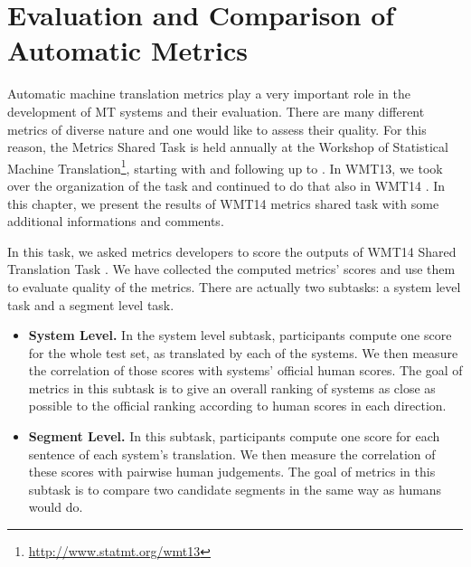 \chapter{Evaluation and Comparison of Automatic Metrics}
\label{metrics}

%
%

Automatic machine translation metrics play a very important role in the
development of MT systems and their evaluation. There are many different
metrics of diverse nature and one would like to assess their quality. For this
reason, the Metrics Shared Task is held annually at the Workshop of Statistical
Machine Translation\footnote{\url{http://www.statmt.org/wmt13}}, starting with
 and following up to
. In WMT13, we took over the organization of the
task  and continued to do that also in WMT14
. In this chapter, we present the results of WMT14
metrics shared task with some additional informations and comments.

In this task, we asked metrics developers to score the outputs of WMT14 Shared
Translation Task . We have collected the computed
metrics' scores and use them to evaluate quality of the metrics.  There are
actually two subtasks: a system level task and a segment level task.

\begin{itemize}

    \item \textbf{System Level.} In the system level subtask, participants
        compute one score for the whole test set, as translated by each of the
        systems. We then measure the correlation of those scores with systems'
        official human scores.  The goal of metrics in this subtask is to give
        an overall ranking of systems as close as possible to the official
        ranking according to human scores in each direction.
    
    \item \textbf{Segment Level.} In this subtask, participants compute one
        score for each sentence of each system's translation. We then measure
        the correlation of these scores with pairwise human judgements. The
        goal of metrics in this subtask is to compare two candidate segments in
        the same way as humans would do.

\end{itemize}

